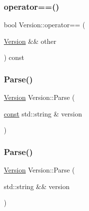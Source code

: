 \subsubsection{\texorpdfstring{operator==()}{operator==()}\hspace{0.1cm}{\footnotesize\ttfamily [2/2]}}
{\footnotesize\ttfamily bool Version\+::operator== (\begin{DoxyParamCaption}\item[{\mbox{\hyperlink{classlucene_1_1core_1_1util_1_1Version}{Version}} \&\&}]{other }\end{DoxyParamCaption}) const}

\mbox{\label{classlucene_1_1core_1_1util_1_1Version_a10eba3883b2be5e104b3216260d8dc13}} 
\subsubsection{\texorpdfstring{Parse()}{Parse()}\hspace{0.1cm}{\footnotesize\ttfamily [1/2]}}
{\footnotesize\ttfamily \mbox{\hyperlink{classlucene_1_1core_1_1util_1_1Version}{Version}} Version\+::\+Parse (\begin{DoxyParamCaption}\item[{\mbox{\hyperlink{ZlibCrc32_8h_a2c212835823e3c54a8ab6d95c652660e}{const}} std\+::string \&}]{version }\end{DoxyParamCaption})\hspace{0.3cm}{\ttfamily [static]}}

\mbox{\label{classlucene_1_1core_1_1util_1_1Version_a3e659501f448ebbac238fe1b3180a9bd}} 
\subsubsection{\texorpdfstring{Parse()}{Parse()}\hspace{0.1cm}{\footnotesize\ttfamily [2/2]}}
{\footnotesize\ttfamily \mbox{\hyperlink{classlucene_1_1core_1_1util_1_1Version}{Version}} Version\+::\+Parse (\begin{DoxyParamCaption}\item[{std\+::string \&\&}]{version }\end{DoxyParamCaption})\hspace{0.3cm}{\ttfamily [static]}}

